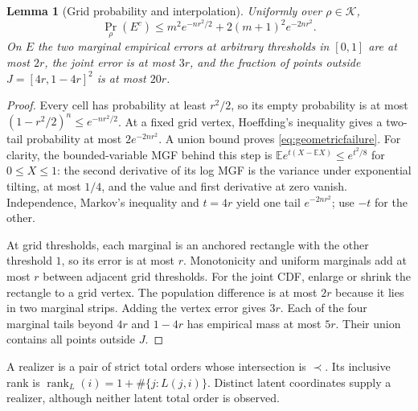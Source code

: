 \documentclass[11pt]{article}
\newtheorem{lemma}[theorem]{Lemma}
\theoremstyle{remark}
\newcommand{\K}{\mathcal K}
\newcommand{\rank}{\operatorname{rank}}
\begin{document}
\begin{lemma}[Grid probability and interpolation]\label{lem:grid}
Uniformly over $\rho\in\K$,
\begin{equation}\label{eq:geometricfailure}
 \Pr_\rho(E^c)\le m^2 e^{-nr^2/2}+2(m+1)^2e^{-2nr^2}.
\end{equation}
On $E$ the two marginal empirical errors at arbitrary thresholds in
$[0,1]$ are at most $2r$, the joint error is at most $3r$, and the
fraction of points outside $J=[4r,1-4r]^2$ is at most $20r$.
\end{lemma}
\begin{proof}
Every cell has probability at least $r^2/2$, so its empty probability
is at most $(1-r^2/2)^n\le e^{-nr^2/2}$.
At a fixed grid vertex, Hoeffding's inequality \cite{Hoeffding}
gives a two-tail probability at most $2e^{-2nr^2}$. A union bound
proves \eqref{eq:geometricfailure}. For clarity, the bounded-variable
MGF behind this step is
$\mathbb E e^{t(X-\mathbb EX)}\le e^{t^2/8}$ for $0\le X\le1$:
the second derivative of its log MGF is the variance under exponential
tilting, at most $1/4$, and the value and first derivative at zero
vanish. Independence, Markov's inequality and $t=4r$ yield one tail
$e^{-2nr^2}$; use $-t$ for the other.

At grid thresholds, each marginal is an anchored rectangle with the
other threshold $1$, so its error is at most $r$. Monotonicity and
uniform marginals add at most $r$ between adjacent grid thresholds.
For the joint CDF, enlarge or shrink the rectangle to a grid vertex.
The population difference is at most $2r$ because it lies in two
marginal strips. Adding the vertex error gives $3r$.
Each of the four marginal tails beyond $4r$ and $1-4r$ has empirical
mass at most $5r$. Their union contains all points outside $J$.
\end{proof}

A realizer is a pair of strict total orders whose intersection is
$\prec$. Its inclusive rank is
$\rank_L(i)=1+\#\{j:L(j,i)\}$. Distinct latent coordinates supply a
realizer, although neither latent total order is observed.
\end{document}
